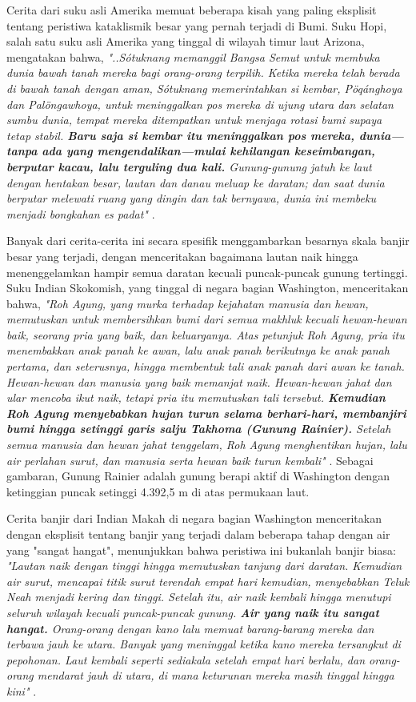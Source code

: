 \documentclass[10pt,twocolumn,letterpaper]{article}
\begin{document}
Cerita dari suku asli Amerika memuat beberapa kisah yang paling eksplisit tentang peristiwa kataklismik besar yang pernah terjadi di Bumi. Suku Hopi, salah satu suku asli Amerika yang tinggal di wilayah timur laut Arizona, mengatakan bahwa, \textit{"..Sótuknang memanggil Bangsa Semut untuk membuka dunia bawah tanah mereka bagi orang-orang terpilih. Ketika mereka telah berada di bawah tanah dengan aman, Sótuknang memerintahkan si kembar, Pöqánghoya dan Palöngawhoya, untuk meninggalkan pos mereka di ujung utara dan selatan sumbu dunia, tempat mereka ditempatkan untuk menjaga rotasi bumi supaya tetap stabil. \textbf{Baru saja si kembar itu meninggalkan pos mereka, dunia—tanpa ada yang mengendalikan—mulai kehilangan keseimbangan, berputar kacau, lalu terguling dua kali.} Gunung-gunung jatuh ke laut dengan hentakan besar, lautan dan danau meluap ke daratan; dan saat dunia berputar melewati ruang yang dingin dan tak bernyawa, dunia ini membeku menjadi bongkahan es padat"} \cite{4}.

Banyak dari cerita-cerita ini secara spesifik menggambarkan besarnya skala banjir besar yang terjadi, dengan menceritakan bagaimana lautan naik hingga menenggelamkan hampir semua daratan kecuali puncak-puncak gunung tertinggi. Suku Indian Skokomish, yang tinggal di negara bagian Washington, menceritakan bahwa, \textit{"Roh Agung, yang murka terhadap kejahatan manusia dan hewan, memutuskan untuk membersihkan bumi dari semua makhluk kecuali hewan-hewan baik, seorang pria yang baik, dan keluarganya. Atas petunjuk Roh Agung, pria itu menembakkan anak panah ke awan, lalu anak panah berikutnya ke anak panah pertama, dan seterusnya, hingga membentuk tali anak panah dari awan ke tanah. Hewan-hewan dan manusia yang baik memanjat naik. Hewan-hewan jahat dan ular mencoba ikut naik, tetapi pria itu memutuskan tali tersebut. \textbf{Kemudian Roh Agung menyebabkan hujan turun selama berhari-hari, membanjiri bumi hingga setinggi garis salju Takhoma (Gunung Rainier).} Setelah semua manusia dan hewan jahat tenggelam, Roh Agung menghentikan hujan, lalu air perlahan surut, dan manusia serta hewan baik turun kembali"} \cite{3}. Sebagai gambaran, Gunung Rainier adalah gunung berapi aktif di Washington dengan ketinggian puncak setinggi 4.392,5 m di atas permukaan laut.

Cerita banjir dari Indian Makah di negara bagian Washington menceritakan dengan eksplisit tentang banjir yang terjadi dalam beberapa tahap dengan air yang "sangat hangat", menunjukkan bahwa peristiwa ini bukanlah banjir biasa: \textit{"Lautan naik dengan tinggi hingga memutuskan tanjung dari daratan. Kemudian air surut, mencapai titik surut terendah empat hari kemudian, menyebabkan Teluk Neah menjadi kering dan tinggi. Setelah itu, air naik kembali hingga menutupi seluruh wilayah kecuali puncak-puncak gunung. \textbf{Air yang naik itu sangat hangat.} Orang-orang dengan kano lalu memuat barang-barang mereka dan terbawa jauh ke utara. Banyak yang meninggal ketika kano mereka tersangkut di pepohonan. Laut kembali seperti sediakala setelah empat hari berlalu, dan orang-orang mendarat jauh di utara, di mana keturunan mereka masih tinggal hingga kini"} \cite{3}.
\end{document}
